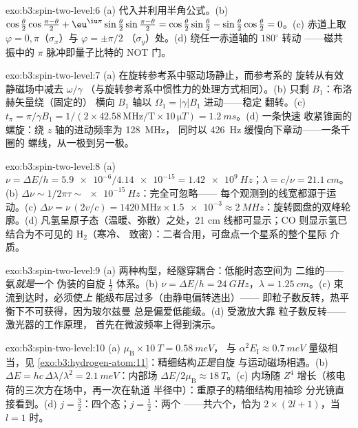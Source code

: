 \begin{solution}{exo:b3:spin-two-level:6}
(a) 代入并利用半角公式。(b)
$\cos\tfrac\theta2\cos\tfrac{\pi-\theta}2 +
\eu^{\iu\pi}\sin\tfrac\theta2\sin\tfrac{\pi-\theta}2 =
\cos\tfrac\theta2\sin\tfrac\theta2 -
\sin\tfrac\theta2\cos\tfrac\theta2 = 0$。(c) 赤道上取
$\varphi = 0, \pi$（$\sigma_x$）与 $\varphi = \pm\pi/2$
（$\sigma_y$）处。(d) 绕任一赤道轴的 $180^\circ$ 转动
——磁共振中的 $\pi$ 脉冲即量子比特的 NOT 门。
\end{solution}

\begin{solution}{exo:b3:spin-two-level:7}
(a) 在旋转参考系中驱动场静止，而参考系的
旋转从有效静磁场中减去 $\omega/\gamma$
（与旋转参考系中惯性力的处理方式相同）。(b) 只剩
$B_1$：布洛赫矢量绕（固定的）
横向 $B_1$ 轴以 $\Omega_1 = |\gamma|B_1$ 进动——稳定
翻转。(c) $t_\pi = \pi/\gamma B_1 = 1/(2 \times 42.58\,\text{
MHz/T} \times 10\,\unit{\micro T}) = \qty{1.2}{ms}$。(d) 一条快速
收紧锥面的螺旋：绕 $z$ 轴的进动频率为 \qty{128}{MHz}，
同时以 \qty{426}{Hz} 缓慢向下章动——一条千圈的
螺线，从一极到另一极。
\end{solution}

\begin{solution}{exo:b3:spin-two-level:8}
(a) $\nu = \Delta E/h = \num{5.9e-6}/\num{4.14e-15} =
\qty{1.42e9}{Hz}$；$\lambda = c/\nu = \qty{21.1}{cm}$。(b) $\Delta
\nu \sim 1/2\pi\tau \sim \qty{e-15}{Hz}$：完全可忽略——
每个观测到的线宽都源于运动。(c) $\Delta\nu =
\nu\,(2v/c) = 1420\,\text{MHz} \times \num{1.5e-3} \approx
\qty{2}{MHz}$：旋转圆盘的双峰轮廓。(d)
凡氢呈原子态（温暖、弥散）之处，21 cm 线都可显示；CO
则显示氢已结合为不可见的 H$_2$（寒冷、
致密）：二者合用，可盘点一个星系的整个星际
介质。
\end{solution}

\begin{solution}{exo:b3:spin-two-level:9}
(a) 两种构型，经隧穿耦合：低能时态空间为
二维的——氨\emph{就是}一个
伪装的自旋 $\tfrac12$ 体系。(b) $\nu = \Delta E/h = \qty{24}{GHz}$，$\lambda =
\qty{1.25}{cm}$。(c) 束流到达时，必须使\emph{上}
能级布居过多（由静电偏转选出）——
即粒子数反转，热平衡下不可获得，因为玻尔兹曼
总是偏爱低能级。(d) 受激放大靠
粒子数反转——激光器的工作原理，
首先在微波频率上得到演示。
\end{solution}

\begin{solution}{exo:b3:spin-two-level:10}
(a) $\mu_{\text{B}} \times \qty{10}{T} = \qty{0.58}{meV}$，
与 $\alpha^2E_{\text{I}} \approx \qty{0.7}{meV}$ 量级相当，见
\cref{exo:b3:hydrogen-atom:11}：精细结构\emph{正是}自旋
与运动磁场相遇。(b) $\Delta E = hc\,\Delta\lambda/
\lambda^2 = \qty{2.1}{meV}$：内部场 $\Delta E/2\mu_{
\text{B}} \approx \qty{18}{T}$。(c) 内场随
$Z^4$ 增长（核电荷的三次方在场中，再一次在轨道
半径中）：重原子的精细结构用袖珍
分光镜直接看到。(d) $j = \tfrac32$：四个态；$j = \tfrac12$：两个
——共六个，恰为 $2 \times (2l + 1)$，当 $l = 1$ 时。
\end{solution}

